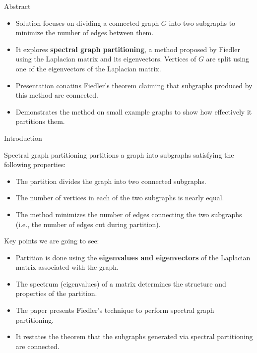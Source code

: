 \documentclass[aspectratio=169]{beamer}
\begin{document}
\begin{frame}{Abstract}
\begin{itemize}
    \item Solution focuses on dividing a connected graph \( G \) into two subgraphs to minimize the number of edges between them.
    
    \item It explores \textbf{spectral graph partitioning}, a method proposed by Fiedler using the Laplacian matrix and its eigenvectors. Vertices of \( G \) are split using one of the eigenvectors of the Laplacian matrix.
    
    \item Presentation conatins Fiedler’s theorem claiming that subgraphs produced by this method are connected.
    
    \item Demonstrates the method on small example graphs to show how effectively it partitions them.
\end{itemize}
\end{frame}


\begin{frame}{Introduction}

Spectral graph partitioning partitions a graph into subgraphs satisfying the following properties:
\begin{itemize}  
    \item The partition divides the graph into two connected subgraphs.
    \item The number of vertices in each of the two subgraphs is nearly equal.
    \item The method minimizes the number of edges connecting the two subgraphs (i.e., the number of edges cut during partition).
\end{itemize}

Key points we are going to see:
\begin{itemize}
    \item Partition is done using the \textbf{eigenvalues and eigenvectors} of the Laplacian matrix associated with the graph.
    \item The spectrum (eigenvalues) of a matrix determines the structure and properties of the partition.
    \item The paper presents Fiedler's technique to perform spectral graph partitioning.
    \item It restates the theorem that the subgraphs generated via spectral partitioning are connected.
\end{itemize}
\end{frame}
\end{document}
